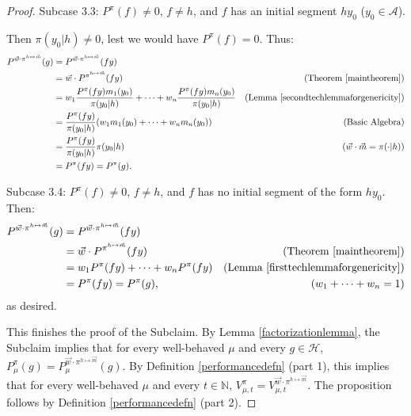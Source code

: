 \documentclass[twoside]{article}
\begin{document}
\begin{proof}
    Subcase 3.3: $P^\pi(f)\not=0$, $f\not=h$, and
    $f$ has an initial segment $h y_0$ ($y_0\in\mathcal A$).

    Then $\pi(y_0|h)\not=0$, lest
    we would have $P^\pi(f)=0$. Thus:
    \begin{align*}
        P^{\vec w\cdot\pi^{h\mapsto \vec m}}(g)
            &= P^{\vec w\cdot \pi^{h\mapsto \vec m}}(fy)\\
            &= \vec w\cdot{P^{\pi^{h\mapsto \vec m}}}(fy)
                    &\mbox{(Theorem \ref{maintheorem})}\\
            &= w_1\frac{P^\pi(fy)m_1(y_0)}{\pi(y_0|h)}
                +\cdots+w_n\frac{P^\pi(fy)m_n(y_0)}{\pi(y_0|h)}
                    &\mbox{(Lemma \ref{secondtechlemmaforgenericity})}\\
            &= \frac{P^\pi(fy)}{\pi(y_0|h)}(w_1m_1(y_0)+\cdots+w_nm_n(y_0))
                    &\mbox{(Basic Algebra)}\\
            &= \frac{P^\pi(fy)}{\pi(y_0|h)}\pi(y_0|h)
                    &\mbox{($\vec w\cdot\vec m=\pi(\cdot|h)$)}\\
            &= P^\pi(fy) = P^\pi(g).
    \end{align*}

    Subcase 3.4: $P^\pi(f)\not=0$, $f\not=h$, and $f$ has no initial segment
        of the form $hy_0$. Then:
    \begin{align*}
        P^{\vec w\cdot\pi^{h\mapsto \vec m}}(g)
            &= P^{\vec w\cdot\pi^{h\mapsto \vec m}}(fy)\\
            &= \vec w\cdot{P^{\pi^{h\mapsto \vec m}}}(fy)
                    &\mbox{(Theorem \ref{maintheorem})}\\
            &= w_1P^\pi(fy)+\cdots+w_nP^\pi(fy)
                    &\mbox{(Lemma \ref{firsttechlemmaforgenericity})}\\
            &= P^\pi(fy) = P^\pi(g),
                    &\mbox{($w_1+\cdots+w_n=1$)}
    \end{align*}
    as desired.

    This finishes the proof of the Subclaim.
    By Lemma \ref{factorizationlemma}, the Subclaim implies
    that for every well-behaved $\mu$ and every $g\in\mathcal H$,
    $
    P^\pi_\mu(g)
    =
    P^{\vec w\cdot\pi^{h\mapsto \vec m}}_\mu(g)
    $.
    By Definition \ref{performancedefn} (part 1), this implies that
    for every well-behaved $\mu$ and every $t\in\mathbb N$,
    $
        V^{\pi}_{\mu,t}
        =
        V^{\vec w\cdot \pi^{h\mapsto \vec m}}_{\mu,t}.
    $
    The proposition follows by Definition \ref{performancedefn} (part 2).
\end{proof}
\end{document}
